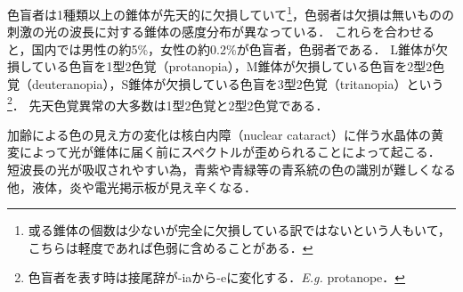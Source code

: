 \documentclass[uplatex,paper=a4,fontsize=4.0truemm,jafontsize=4.0truemm,head_space=30.0truemm,foot_space=30.0truemm,baselineskip=8.0truemm,line_length=40zw,gutter=25.0truemm,oneside,openany,fleqn,hanging_panctuation,open_bracket_pos=nibu_tentsuki,dvipdfmx,jis2004,book,titlepage]{jlreq}
\theoremstyle{mystyle}
\begin{document}
			色盲者は1種類以上の錐体が先天的に欠損していて\footnote{或る錐体の個数は少ないが完全に欠損している訳ではないという人もいて，こちらは軽度であれば色弱に含めることがある．}，色弱者は欠損は無いものの刺激の光の波長に対する錐体の感度分布が異なっている．
			これらを合わせると，国内では男性の約5\%，女性の約0.2\%が色盲者，色弱者である\cite[p.~4]{doctors2019}．
			L錐体が欠損している色盲を1型2色覚（protanopia），M錐体が欠損している色盲を2型2色覚（deuteranopia），S錐体が欠損している色盲を3型2色覚（tritanopia）という\footnote{色盲者を表す時は接尾辞が-iaから-eに変化する．\textit{E.g.} protanope．}．
			先天色覚異常の大多数は1型2色覚と2型2色覚である\cite[p.~9]{doctors2014}．

			加齢による色の見え方の変化は核白内障（nuclear cataract）に伴う水晶体の黄変によって光が錐体に届く前にスペクトルが歪められることによって起こる．
			短波長の光が吸収されやすい為，青紫や青緑等の青系統の色の識別が難しくなる他，液体，炎や電光掲示板が見え辛くなる\cite{Ishihara1998}．
\end{document}
